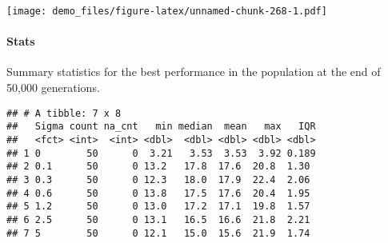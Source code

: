 \documentclass[]{book}
\newenvironment{Shaded}{\begin{snugshade}}{\end{snugshade}}
\newcommand{\DataTypeTok}[1]{\textcolor[rgb]{0.13,0.29,0.53}{#1}}
\newcommand{\KeywordTok}[1]{\textcolor[rgb]{0.13,0.29,0.53}{\textbf{#1}}}
\newcommand{\NormalTok}[1]{#1}
\newcommand{\OperatorTok}[1]{\textcolor[rgb]{0.81,0.36,0.00}{\textbf{#1}}}
\newcommand{\OtherTok}[1]{\textcolor[rgb]{0.56,0.35,0.01}{#1}}
\newcommand{\StringTok}[1]{\textcolor[rgb]{0.31,0.60,0.02}{#1}}
\let\oldparagraph\paragraph
\renewcommand{\paragraph}[1]{\oldparagraph{#1}\mbox{}}
\begin{document}
\texttt{[image: demo\_files/figure-latex/unnamed-chunk-268-1.pdf]}

\hypertarget{stats-51}{%
\paragraph{Stats}\label{stats-51}}

Summary statistics for the best performance in the population at the end of 50,000 generations.

\begin{Shaded}
\end{Shaded}

\begin{verbatim}
## # A tibble: 7 x 8
##   Sigma count na_cnt   min median  mean   max   IQR
##   <fct> <int>  <int> <dbl>  <dbl> <dbl> <dbl> <dbl>
## 1 0        50      0  3.21   3.53  3.53  3.92 0.189
## 2 0.1      50      0 13.2   17.8  17.6  20.8  1.30 
## 3 0.3      50      0 12.3   18.0  17.9  22.4  2.06 
## 4 0.6      50      0 13.8   17.5  17.6  20.4  1.95 
## 5 1.2      50      0 13.0   17.2  17.1  19.8  1.57 
## 6 2.5      50      0 13.1   16.5  16.6  21.8  2.21 
## 7 5        50      0 12.1   15.0  15.6  21.9  1.74
\end{verbatim}
\end{document}
